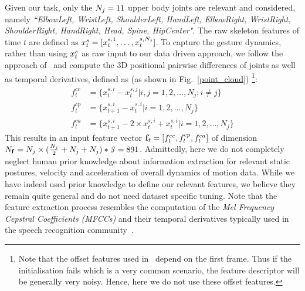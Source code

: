Given our task, only  the $N_j=11$ upper body joints are relevant and
considered, namely \emph{``ElbowLeft, WristLeft, ShoulderLeft, HandLeft, ElbowRight, WristRight, ShoulderRight, HandRight, Head, Spine, HipCenter"}.
%
The raw skeleton features of time $t$ are defined as $x^s_t=[x_t^{s,1}, \ldots, x_t^{s, N_j}]$.
To capture the gesture dynamics, rather than using $x^s_t$ as raw input to our data driven approach,
we follow the approach of~\cite{diwucvpr14} and compute the 3D positional pairwise differences of joints as well as temporal derivatives, defined as (as shown in Fig.~\ref{point_cloud}) \footnote{Note that the offset features used in~\cite{diwucvpr14} depend on the first frame.
Thus if the initialisation fails which is a very common scenario, the feature descriptor will be generally very noisy.
Hence, here we do not use these offset features.}:
\begin{align}
f^{cc}_t&=\{x_t^{s,i}-x_t^{s,j} | i,j=1,2,\ldots, N_j; i\neq j\} \label{sk_features_1}\\
f^{cp}_t&=\{x_{t+1}^{s,i}-x_t^{s,i} |  i=1,2,\ldots, N_j\} \label{sk_features_2}\\
f^{ca}_t&=\{x_{t+1}^{s,i} - 2 \times x_t^{s,i} + x_t^{s,i} | i=1,2,\ldots, N_j  \} \label{sk_features_3}
\end{align}
%
This results in an input feature vector $\mathbf{f}_t=[f^{cc}_t, f^{cp}_t, f^{ca}_t]$ of dimension $N_{\mathbf{f}}=N_j \times( \frac{ N_j}{2} + N_j + N_j)*\mathit{3}=891$.
Admittedly, here we do not completely neglect human prior knowledge about information extraction for relevant static postures, velocity and acceleration of overall dynamics of motion data.
While we have indeed used prior knowledge to define our relevant features, we believe they remain quite general and do not need dataset specific tuning.
Note that the feature extraction process resembles the computation of the
\emph{Mel Frequency Cepstral Coefficients (MFCCs)} and their temporal derivatives
typically used in the  speech recognition community~\cite{mohamed2012acoustic}.

